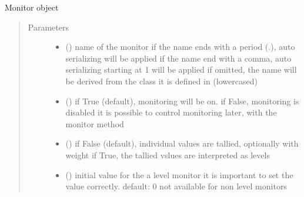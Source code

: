 \documentclass[letterpaper,10pt,english]{sphinxmanual}
\begin{document}
\begin{fulllineitems}
\label{\detokenize{Reference:salabim.Monitor}}
Monitor object
\begin{quote}\begin{description}
\item[{Parameters}] \leavevmode\begin{itemize}
\item {} 
 () \textendash{} name of the monitor 
if the name ends with a period (.),
auto serializing will be applied 
if the name end with a comma,
auto serializing starting at 1 will be applied 
if omitted, the name will be derived from the class
it is defined in (lowercased)

\item {} 
 () \textendash{} if True (default), monitoring will be on. 
if False, monitoring is disabled 
it is possible to control monitoring later,
with the monitor method

\item {} 
 () \textendash{} if False (default), individual values are tallied, optionally with weight 
if True, the tallied vslues are interpreted as levels

\item {} 
 (\sphinxstyleliteralemphasis{\sphinxupquote{, }}\sphinxstyleliteralemphasis{\sphinxupquote{, }}) \textendash{} initial value for the a level monitor 
it is important to set the value correctly.
default: 0 
not available for non level monitors


\end{itemize}
\end{description}
\end{quote}
\end{fulllineitems}
\end{document}
